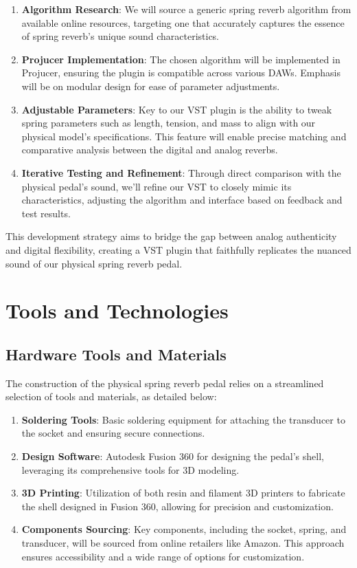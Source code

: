 \documentclass[12pt]{article}
\begin{document}
\begin{enumerate}
    \item \textbf{Algorithm Research}: We will source a generic spring reverb algorithm from available online resources, targeting one that accurately captures the essence of spring reverb's unique sound characteristics.
    
    \item \textbf{Projucer Implementation}: The chosen algorithm will be implemented in Projucer, ensuring the plugin is compatible across various DAWs. Emphasis will be on modular design for ease of parameter adjustments.
    
    \item \textbf{Adjustable Parameters}: Key to our VST plugin is the ability to tweak spring parameters such as length, tension, and mass to align with our physical model's specifications. This feature will enable precise matching and comparative analysis between the digital and analog reverbs.
    
    \item \textbf{Iterative Testing and Refinement}: Through direct comparison with the physical pedal's sound, we'll refine our VST to closely mimic its characteristics, adjusting the algorithm and interface based on feedback and test results.
    
\end{enumerate}

This development strategy aims to bridge the gap between analog authenticity and digital flexibility, creating a VST plugin that faithfully replicates the nuanced sound of our physical spring reverb pedal.


\newpage
\section{Tools and Technologies}

\subsection{Hardware Tools and Materials}
The construction of the physical spring reverb pedal relies on a streamlined selection of tools and materials, as detailed below:

\begin{enumerate}
    \item \textbf{Soldering Tools}: Basic soldering equipment for attaching the transducer to the socket and ensuring secure connections.
    \item \textbf{Design Software}: Autodesk Fusion 360 for designing the pedal's shell, leveraging its comprehensive tools for 3D modeling.
    \item \textbf{3D Printing}: Utilization of both resin and filament 3D printers to fabricate the shell designed in Fusion 360, allowing for precision and customization.
    \item \textbf{Components Sourcing}: Key components, including the socket, spring, and transducer, will be sourced from online retailers like Amazon. This approach ensures accessibility and a wide range of options for customization.
\end{enumerate}
\end{document}
